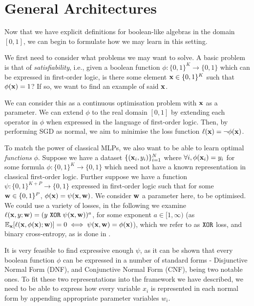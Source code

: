 \section{General Architectures}
\label{section:fuzzyloss}

Now that we have explicit definitions for boolean-like algebras in the domain $[0,1]$, we can begin to formulate how we may learn in this setting.

We first need to consider what problems we may want to solve. A basic problem is that of \textit{satisfiability}, i.e., given a boolean function $\phi : \{0,1\}^K \rightarrow \{0,1\}$ which can be expressed in first-order logic, is there some element $\mathbf{x} \in \{0,1\}^K$ such that $\phi(\mathbf{x}) = 1$? If so, we want to find an example of said $\mathbf{x}$.

We can consider this as a continuous optimisation problem with $\mathbf{x}$ as a parameter. We can extend $\phi$ to the real domain $[0,1]$ by extending each operator in $\phi$ when expressed in the language of first-order logic. Then, by performing SGD as normal, we aim to minimise the loss function $\ell(\mathbf{x}) = \lnot\phi(\mathbf{x})$.

To match the power of classical MLPs, we also want to be able to learn optimal \textit{functions} $\phi$. Suppose we have a dataset $\{(\mathbf{x}_i, y_i)\}_{i=1}^N$ where $\forall i, \phi(\mathbf{x}_i) = y_i$ for some formula $\phi : \{0,1\}^K  \rightarrow \{0,1\}$ which need not have a known representation in classical first-order logic. Further suppose we have a function $\psi : \{0,1\}^{K+P} \rightarrow \{0,1\}$ expressed in first-order logic such that for some $\mathbf{w} \in \{0,1\}^P$, $\phi(\mathbf{x}) = \psi(\mathbf{x}, \mathbf{w})$. We consider $\mathbf{w}$ a parameter here, to be optimised. We could use a variety of losses, in the following we examine $\ell(\mathbf{x}, y; \mathbf{w}) = (y \ \texttt{XOR}\  \psi(\mathbf{x}, \mathbf{w}))^a$, for some exponent $a \in [1,\infty)$ (as $\mathbb{E}_{\mathbf{x}}[\ell(\mathbf{x}, \phi(\mathbf{x}); \mathbf{w})] = 0 \iff \psi(\mathbf{x}, \mathbf{w}) = \phi(\mathbf{x})$), which we refer to as $\texttt{XOR}$ loss, and binary cross-entropy, as is done in \cite{embeddedlogicreg}. 

It is very feasible to find expressive enough $\psi$, as it can be shown that every boolean function $\phi$ can be expressed in a number of standard forms - Disjunctive Normal Form (DNF), and Conjunctive Normal Form (CNF), being two notable ones. To fit these two representations into the framework we have described, we need to be able to express how every variable $x_i$ is represented in each normal form by appending appropriate parameter variables $w_i$.

